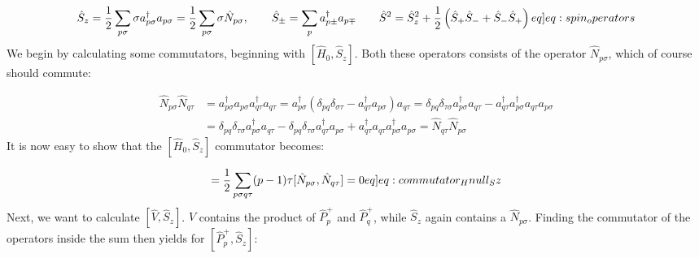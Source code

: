 \documentclass{article}
\newcommand{\crt}[1]{a_{#1}^{\dagger}}
\newcommand{\ani}[1]{a_{#1}}
\newcommand{\spinop}[1]{\hat{S}_{#1}}
\newcommand{\pplus}[1]{\hat{P}_{#1}^{+}}
\newcommand{\numberop}[1]{\hat{N}_{#1}}
\begin{document}
\begin{align}
    \spinop{z} = \frac{1}{2} \sum_{p\sigma} \sigma \crt{p\sigma}\ani{p\sigma} = \frac{1}{2}\sum_{p\sigma} \sigma \numberop{p\sigma},\hspace{20px} \spinop{\pm} = \sum_p \crt{p\pm}\ani{p\mp}\hspace{20px}\spinop{}^2 = \spinop{z}^2 + \frac{1}{2}\left( \spinop{+}\spinop{-} + \spinop{-}\spinop{+}\right) \label[eq]{eq:spin_operators}
\end{align}
We begin by calculating some commutators, beginning with $[\hat{H}_0, \spinop{z}]$. Both these operators consists of the operator $\numberop{p\sigma}$, which of course should commute:   

\begin{align*}
    \numberop{p\sigma}\numberop{q\tau} &= \crt{p\sigma}\ani{p\sigma}\crt{q\tau}\ani{q\tau} = \crt{p\sigma} (\delta_{pq}\delta_{\sigma\tau} - \crt{q\tau}\ani{p\sigma})a_{q\tau} = \delta_{pq}\delta_{\tau\sigma}\crt{p\sigma}\ani{q\tau} - \crt{q\tau}\crt{p\sigma}\ani{q\tau}\ani{p\sigma} \\
    &= \delta_{pq}\delta_{\tau\sigma}\crt{p\sigma}\ani{q\tau} - \delta_{pq}\delta_{\tau\sigma}\crt{q\tau}\ani{p\sigma} + \crt{q\tau}\ani{q\tau}\crt{p\sigma}\ani{p\sigma} = \numberop{q\tau}\numberop{p\sigma}
\end{align*}
It is now easy to show that the $[\hat{H}_0, \spinop{z}]$ commutator becomes:

\begin{align}
    [\hat{H_0}, \spinop{z}] = \frac{1}{2}\sum_{p\sigma q\tau} (p-1)\tau [\numberop{p\sigma}, \numberop{q\tau}] = 0 \label[eq]{eq:commutator_Hnull_Sz}
\end{align}
Next, we want to calculate $[\hat{V}, \spinop{z}]$. $\hat{V}$ contains the product of $\pplus{p}$ and $\pplus{q}$, while $\spinop{z}$ again contains a $\numberop{p\sigma}$. Finding the commutator of the operators inside the sum then yields for $[\pplus{p}, \spinop{z}]$:  
\end{document}
